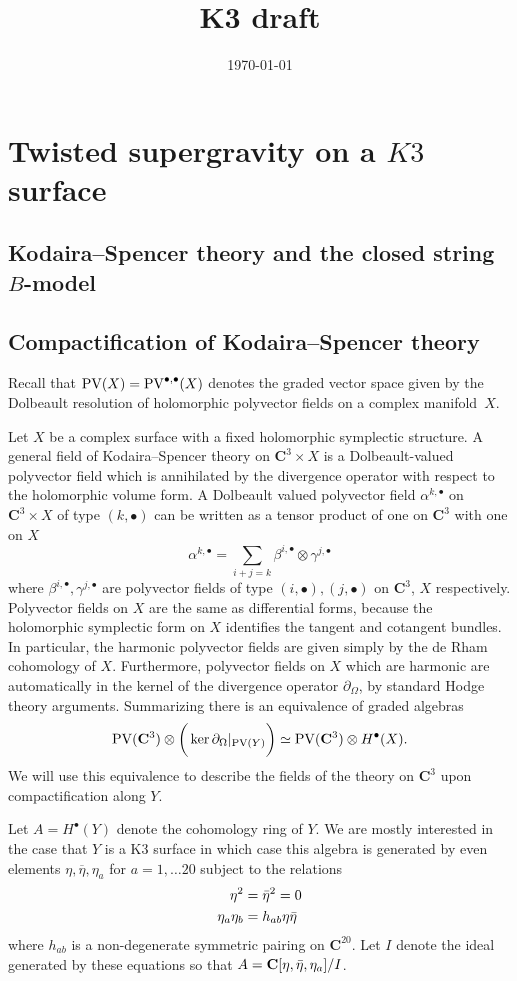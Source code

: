 \documentclass[11pt]{amsart}
\title{K3 draft}
\date{\today}
\newcommand{\PV}{\op{PV}}
\newcommand{\br}{\overline}
\def\PV{{\rm PV}}
\newcommand{\op}{\operatorname}
\def\bu{{\bullet}}
\renewcommand\div{{\partial_\Omega}}
\newcommand\C{\mathbf{C}}
\newcommand\beqn{\begin{equation}}
\newcommand\eeqn{\end{equation}}
\theoremstyle{thm}
\numberwithin{equation}{subsection}
\theoremstyle{def}
\theoremstyle{rem}
\begin{document}
\maketitle

\tableofcontents

\section{Twisted supergravity on a $K3$ surface}

\subsection{Kodaira--Spencer theory and the closed string $B$-model}

\subsection{Compactification of Kodaira--Spencer theory}

Recall that $\PV (X) = \PV^{\bu,\bu}(X)$ denotes the graded vector space given by the Dolbeault resolution of holomorphic polyvector fields on a complex manifold~$X$.

Let $X$ be a complex surface with a fixed holomorphic symplectic structure.
A general field of Kodaira--Spencer theory on $\C^3 \times X$ is a Dolbeault-valued polyvector field which is annihilated by the divergence operator with respect to the holomorphic volume form.
A Dolbeault valued polyvector field $\alpha^{k,\bu}$ on $\C^3 \times X$ of type $(k,\bu)$ can be written as a tensor product of one on $\C^3$ with one on $X$
\beqn
\alpha^{k,\bu} = \sum_{i+j=k} \beta^{i,\bu} \otimes \gamma^{j,\bu} 
\eeqn
where $\beta^{i,\bu},\gamma^{j,\bu}$ are polyvector fields of type $(i,\bu),(j,\bu)$ on $\C^3$, $X$ respectively.
Polyvector fields on $X$ are the same as differential forms, because the holomorphic symplectic form on $X$ identifies the tangent and cotangent bundles. 
In particular, the harmonic polyvector fields are given simply by the de Rham cohomology of $X$.  
Furthermore, polyvector fields on $X$ which are harmonic are automatically in the kernel of the divergence operator $\div$, by standard Hodge theory arguments.   
Summarizing there is an equivalence of graded algebras
\[
\PV (\C^3) \otimes \bigg(\ker \div |_{\PV(Y)} \bigg) \simeq \PV(\C^3) \otimes H^\bu(X) .
\]
We will use this equivalence to describe the fields of the theory on $\C^3$ upon compactification along $Y$. 

Let $A = H^\bu(Y)$ denote the cohomology ring of $Y$.
We are mostly interested in the case that $Y$ is a K3 surface in which case this algebra is generated by even elements $\eta, \br \eta, \eta_a$ for $a=1,\ldots 20$ subject to the relations
\beqn
\label{eqn:K3rel}
\begin{split}
\eta^2 & = \Bar{\eta}^2 = 0 \\
\eta_a \eta_b & = h_{ab} \eta \Bar{\eta} 
\end{split}
\eeqn
where $h_{ab}$ is a non-degenerate symmetric pairing on $\C^{20}$. 
Let $I$ denote the ideal generated by these equations so that $A = \C[\eta,\Bar{\eta}, \eta_a] / I$. 
\end{document}
